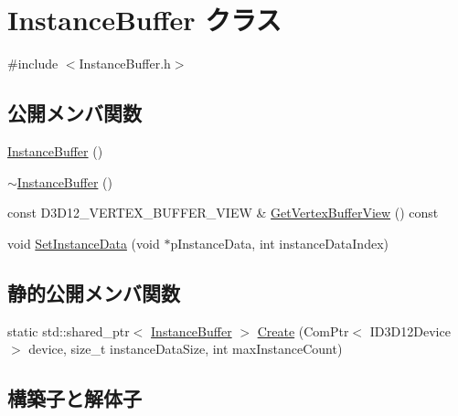 \hypertarget{class_instance_buffer}{}\section{Instance\+Buffer クラス}
\label{class_instance_buffer}


{\ttfamily \#include $<$Instance\+Buffer.\+h$>$}

\subsection*{公開メンバ関数}
\begin{DoxyCompactItemize}
\item 
\mbox{\hyperlink{class_instance_buffer_a58ffffaa829536d4b8784b9dcfc44d7c}{Instance\+Buffer}} ()
\item 
\mbox{\hyperlink{class_instance_buffer_a8ccc5533de5518e9a71d90ee0f08c6d3}{$\sim$\+Instance\+Buffer}} ()
\item 
const D3\+D12\+\_\+\+V\+E\+R\+T\+E\+X\+\_\+\+B\+U\+F\+F\+E\+R\+\_\+\+V\+I\+EW \& \mbox{\hyperlink{class_instance_buffer_a5491ee0720bd874c6b5c2bf677ee2416}{Get\+Vertex\+Buffer\+View}} () const
\item 
void \mbox{\hyperlink{class_instance_buffer_af234a261c027598ba29298c48c315a3c}{Set\+Instance\+Data}} (void $\ast$p\+Instance\+Data, int instance\+Data\+Index)
\end{DoxyCompactItemize}
\subsection*{静的公開メンバ関数}
\begin{DoxyCompactItemize}
\item 
static std\+::shared\+\_\+ptr$<$ \mbox{\hyperlink{class_instance_buffer}{Instance\+Buffer}} $>$ \mbox{\hyperlink{class_instance_buffer_acf5d0dd11793b224d2a10fa86876aac8}{Create}} (Com\+Ptr$<$ I\+D3\+D12\+Device $>$ device, size\+\_\+t instance\+Data\+Size, int max\+Instance\+Count)
\end{DoxyCompactItemize}


\subsection{構築子と解体子}
\mbox{\label{class_instance_buffer_a58ffffaa829536d4b8784b9dcfc44d7c}} 
